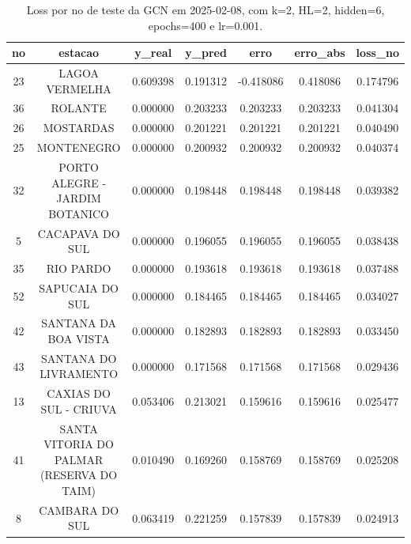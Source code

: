 \begin{table}[h]
\centering
\caption{Loss por no de teste da GCN em 2025-02-08, com k=2, HL=2, hidden=6, epochs=400 e lr=0.001.}
\label{tab:gcn_loss_k2_hl2_h6_e400_d20250208}
\begin{tabular}{ccccccc}
\toprule
no & estacao & y\_real & y\_pred & erro & erro\_abs & loss\_no \\
\midrule
23 & LAGOA VERMELHA & 0.609398 & 0.191312 & -0.418086 & 0.418086 & 0.174796 \\
36 & ROLANTE & 0.000000 & 0.203233 & 0.203233 & 0.203233 & 0.041304 \\
26 & MOSTARDAS & 0.000000 & 0.201221 & 0.201221 & 0.201221 & 0.040490 \\
25 & MONTENEGRO & 0.000000 & 0.200932 & 0.200932 & 0.200932 & 0.040374 \\
32 & PORTO ALEGRE - JARDIM BOTANICO & 0.000000 & 0.198448 & 0.198448 & 0.198448 & 0.039382 \\
5 & CACAPAVA DO SUL & 0.000000 & 0.196055 & 0.196055 & 0.196055 & 0.038438 \\
35 & RIO PARDO & 0.000000 & 0.193618 & 0.193618 & 0.193618 & 0.037488 \\
52 & SAPUCAIA DO SUL & 0.000000 & 0.184465 & 0.184465 & 0.184465 & 0.034027 \\
42 & SANTANA DA BOA VISTA & 0.000000 & 0.182893 & 0.182893 & 0.182893 & 0.033450 \\
43 & SANTANA DO LIVRAMENTO & 0.000000 & 0.171568 & 0.171568 & 0.171568 & 0.029436 \\
13 & CAXIAS DO SUL - CRIUVA & 0.053406 & 0.213021 & 0.159616 & 0.159616 & 0.025477 \\
41 & SANTA VITORIA DO PALMAR (RESERVA DO TAIM) & 0.010490 & 0.169260 & 0.158769 & 0.158769 & 0.025208 \\
8 & CAMBARA DO SUL & 0.063419 & 0.221259 & 0.157839 & 0.157839 & 0.024913 \\
\bottomrule
\end{tabular}
\end{table}
